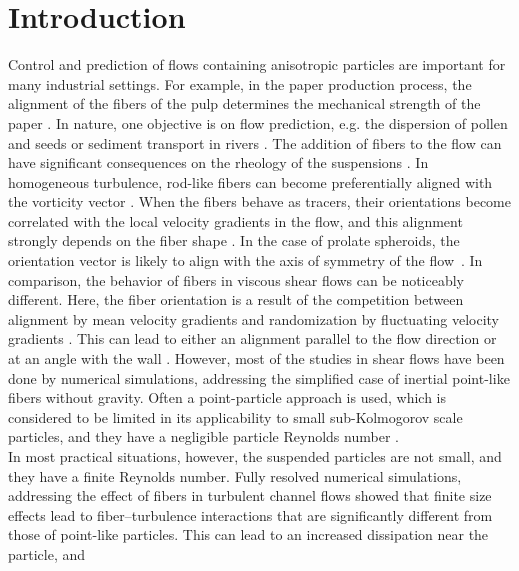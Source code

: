 \section{Introduction}
Control and prediction of flows containing anisotropic particles are important
for many industrial settings. For example, in the paper production process,
the alignment of the fibers of the pulp determines the mechanical strength of
the paper \citep{Lundell2011}. In nature, one objective is on flow prediction,
e.g. the dispersion of pollen and seeds \citep{Sabban2017} or sediment
transport in rivers \citep{Vercruysse2017}. The addition of fibers to the flow
can have significant consequences on the rheology of the suspensions
\citep{Butler2018, Daghooghi2015}.  In homogeneous turbulence, rod-like fibers
can become preferentially aligned with the vorticity vector
\citep{Wilkinson2009, Parsa2011, Pumir2011, Parsa2012, Voth2017}. When the
fibers behave as tracers, their orientations become correlated with the local
velocity gradients in the flow, and this alignment strongly depends on the
fiber shape \citep{Parsa2012}. In the case of prolate spheroids, the
orientation vector is likely to align with the axis of symmetry of the
flow~\citep{Vincenzi2013}.  In comparison, the behavior of fibers in viscous
shear flows can be noticeably different. Here, the fiber orientation is a
result of the competition between alignment by mean velocity gradients and
randomization by fluctuating velocity gradients \cite{Voth2017}.  This can
lead to either an alignment parallel to the flow direction \citep{Jeffery1922,
Butler1999} or at an angle with the wall \cite{zhang2001, mortensen2008,
Marchioli2010, Marchioli2013, Challabotla2015c, Zhao2015b, Zhao2015}.
However, most of the studies in shear flows have been done by numerical
simulations, addressing the simplified case of inertial point-like fibers
without gravity.  Often a point-particle approach is used, which is considered
to be limited in its applicability to small sub-Kolmogorov scale
\cite{Kolmogorov1941, Kolmogorov1941b} particles, and they have a negligible
particle Reynolds number \cite{Maxey1983}.\\
\indent In most practical situations, however, the suspended particles are not small,
and they have a finite Reynolds number.  Fully resolved numerical simulations,
addressing the effect of fibers in turbulent channel flows showed
that finite size effects lead to fiber--turbulence
interactions that are significantly different from those of point-like
particles\cite{DoQuang2014}. This can lead to an increased dissipation near the particle, and

